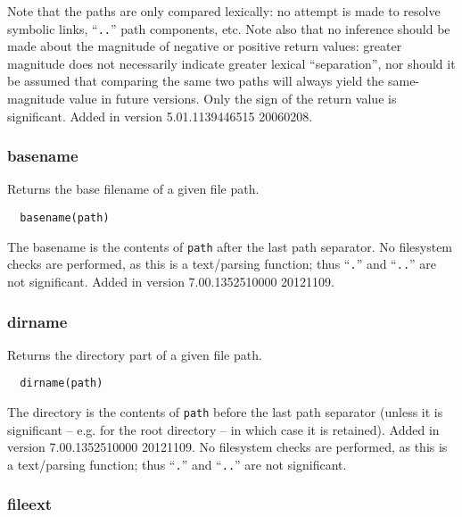   Note that the paths are only compared lexically: no attempt is made
to resolve symbolic links, ``{\tt ..}'' path components, etc.  Note
also that no inference should be made about the magnitude of negative
or positive return values: greater magnitude does not necessarily
indicate greater lexical ``separation'', nor should it be assumed that
comparing the same two paths will always yield the same-magnitude
value in future versions.  Only the sign of the return value is
significant.  Added in version 5.01.1139446515 20060208.

\subsubsection{basename}

  Returns the base filename of a given file path.

\begin{verbatim}
  basename(path)
\end{verbatim}

The basename is the contents of \verb`path` after the last path separator.
No filesystem checks are performed, as this is a text/parsing function;
thus ``\verb`.`'' and ``\verb`..`'' are not significant.
Added in version 7.00.1352510000 20121109.

\subsubsection{dirname}

  Returns the directory part of a given file path.

\begin{verbatim}
  dirname(path)
\end{verbatim}

The directory is the contents of \verb`path` before the last path separator
(unless it is significant -- e.g. for the root directory -- in which case
it is retained).  Added in version 7.00.1352510000 20121109.
No filesystem checks are performed, as this is a text/parsing function;
thus ``\verb`.`'' and ``\verb`..`'' are not significant.

\subsubsection{fileext}

